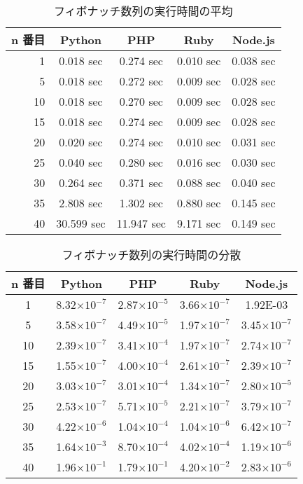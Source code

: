 \begin{table}[tb]
\centering
\begin{tabular}{|r||c|c|c|c|}
\hline
n 番目 & Python & PHP &Ruby	&Node.js \\ \hline \hline
1	&0.018 sec	&0.274 sec	&0.010 sec	&0.038 sec \\ \hline
5	&0.018 sec	&0.272 sec	&0.009 sec	&0.028 sec \\ \hline
10	&0.018 sec	&0.270 sec	&0.009 sec	&0.028 sec \\ \hline
15	&0.018 sec	&0.274 sec	&0.009 sec	&0.028 sec \\ \hline
20	&0.020 sec	&0.274 sec	&0.010 sec	&0.031 sec \\ \hline
25	&0.040 sec	&0.280 sec	&0.016 sec	&0.030 sec \\ \hline
30	&0.264 sec	&0.371 sec	&0.088 sec	&0.040 sec \\ \hline
35	&2.808 sec	&1.302 sec	&0.880 sec	&0.145 sec \\ \hline
40	&30.599	sec &11.947 sec	&9.171 sec	&0.149 sec \\ \hline
\end{tabular}
\caption{フィボナッチ数列の実行時間の平均}
\label{table:f-average}
\end{table}

\begin{table}[tb]
\centering
\begin{tabular}{|c||c|c|c|c|}
\hline

n 番目	&Python	&PHP	&Ruby	&Node.js\\ \hline \hline
1	&8.32$\times 10^{-7}$	&2.87$\times 10^{-5}$	&3.66$\times 10^{-7}$	&1.92E-03\\ \hline
5	&3.58$\times 10^{-7}$	&4.49$\times 10^{-5}$	&1.97$\times 10^{-7}$	&3.45$\times 10^{-7}$\\ \hline
10	&2.39$\times 10^{-7}$	&3.41$\times 10^{-4}$	&1.97$\times 10^{-7}$	&2.74$\times 10^{-7}$\\ \hline
15	&1.55$\times 10^{-7}$	&4.00$\times 10^{-4}$	&2.61$\times 10^{-7}$	&2.39$\times 10^{-7}$\\ \hline
20	&3.03$\times 10^{-7}$	&3.01$\times 10^{-4}$	&1.34$\times 10^{-7}$	&2.80$\times 10^{-5}$\\ \hline
25	&2.53$\times 10^{-7}$	&5.71$\times 10^{-5}$	&2.21$\times 10^{-7}$	&3.79$\times 10^{-7}$\\ \hline
30	&4.22$\times 10^{-6}$	&1.04$\times 10^{-4}$	&1.04$\times 10^{-6}$	&6.42$\times 10^{-7}$\\ \hline
35	&1.64$\times 10^{-3}$	&8.70$\times 10^{-4}$	&4.02$\times 10^{-4}$	&1.19$\times 10^{-6}$\\ \hline
40	&1.96$\times 10^{-1}$	&1.79$\times 10^{-1}$	&4.20$\times 10^{-2}$	&2.83$\times 10^{-6}$\\ \hline

\end{tabular}
\caption{フィボナッチ数列の実行時間の分散}
\label{table:f-dispersion}
\end{table}

